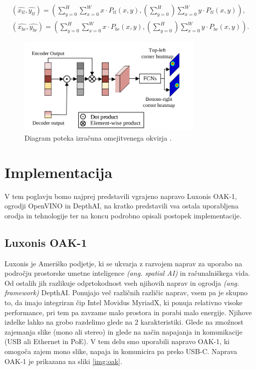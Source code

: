 \documentclass[a4paper,12pt,openright]{book}
\begin{document}
\begin{equation}
    \begin{split}
        (\hat{x_{tl}}, \hat{y_{tl}}) = (\sum_{y=0}^{H} \sum_{x=0}^{W} x \cdot P_{tl}(x,y), (\sum_{y=0}^{H}) \sum_{x=0}^{W} y \cdot P_{tl}(x,y)), \\
        (\hat{x_{br}}, \hat{y_{br}}) = (\sum_{y=0}^{H} \sum_{x=0}^{W} x \cdot P_{br}(x,y), (\sum_{y=0}^{H}) \sum_{x=0}^{W} y \cdot P_{br}(x,y)).
    \end{split}
    \label{eq:8}
\end{equation}

\begin{figure}[htb]
    \begin{center}
        \includegraphics[width=0.8\textwidth]{img/bbox_head.png}
    \end{center}
    \caption{Diagram poteka izračuna omejitvenega okvirja \cite{attention_is_all_you_need}.}
    \label{img:bbox_head}
\end{figure}

\chapter{Implementacija
  \label{ch:2}}
V tem poglavju bomo najprej predstavili vgrajeno napravo Luxonis OAK-1, ogrodji OpenVINO in DepthAI, na kratko predstavili vsa ostala uporabljena orodja in tehnologije ter na koncu podrobno opisali postopek implementacije.

\section{Luxonis OAK-1}
Luxonis je Ameriško podjetje, ki se ukvarja z razvojem naprav za uporabo na področju prostorske umetne inteligence \emph{(ang. spatial AI)} in računalniškega vida. Od ostalih jih razlikuje odprtokodnost vseh njihovih naprav in ogrodja \emph{(ang. framework)} DepthAI. Ponujajo več različnih različic naprav, vsem pa je skupno to, da imajo integriran čip Intel Movidus MyriadX, ki ponuja relativno visoke performance, pri tem pa zavzame malo prostora in porabi malo energije. Njihove izdelke lahko na grobo razdelimo glede na 2 karakteristiki. Glede na zmožnost zajemanja slike (mono ali stereo) in glede na način napajanja in komunikacije (USB ali Ethernet in PoE). V tem delu smo uporabili napravo OAK-1, ki omogoča zajem mono slike, napaja in komunicira pa preko USB-C. Naprava OAK-1 je prikazana na sliki \ref{img:oak}.
\end{document}
